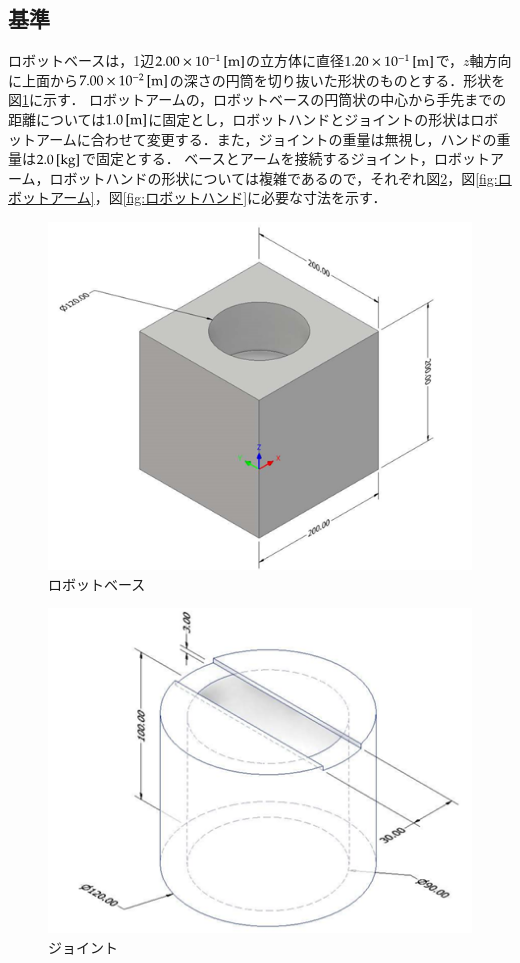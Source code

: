 \documentclass[10pt,b5paper,papersize,dvipdfmx]{jsbook}
\begin{document}
\subsection{基準}\label{基準}
ロボットベースは，1辺$2.00\times10^{-1} \tani*{m}$の立方体に直径$1.20\times10^{-1} \tani*{m}$で，$z$軸方向に上面から$7.00\times10^{-2} \tani*{m}$の深さの円筒を切り抜いた形状のものとする．形状を図\ref{fig:ロボットベース}に示す．
ロボットアームの，ロボットベースの円筒状の中心から手先までの距離については$1.0\tani*{m}$に固定とし，ロボットハンドとジョイントの形状はロボットアームに合わせて変更する．また，ジョイントの重量は無視し，ハンドの重量は$2.0\tani*{kg}$で固定とする．
ベースとアームを接続するジョイント，ロボットアーム，ロボットハンドの形状については複雑であるので，それぞれ図\ref{fig:ジョイント}，図\ref{fig:ロボットアーム}，図\ref{fig:ロボットハンド}に必要な寸法を示す．
\begin{figure}[H]
  \centering
  \includegraphics[width=.85\textwidth]{img/robot02.png}
  \caption{ロボットベース}
  \label{fig:ロボットベース}
\end{figure}
\begin{figure}[htb]
  \centering
  \includegraphics[width=.9\textwidth]{img/robot03.png}
  \caption{ジョイント}
  \label{fig:ジョイント}
\end{figure}
\end{document}
